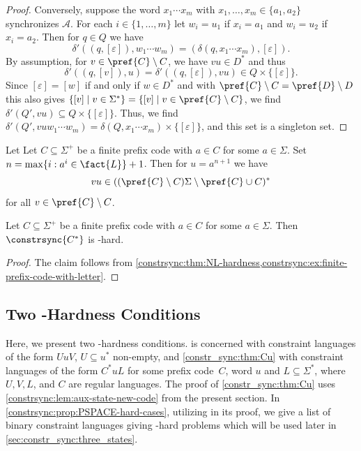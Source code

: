\begin{proof}
	Conversely, suppose the word $x_1 \cdots x_m$ with $x_1,\ldots,x_m \in \{a_1, a_2\}$
	synchronizes $\mathcal A$.
	For each $i \in \{1,\ldots,m\}$
	let $w_i = u_1$ if $x_i = a_1$ and $w_i = u_2$ if $x_i = a_2$.
	Then for $q \in Q$
	we have
	\[
	\delta'((q, [\varepsilon]), w_1 \cdots w_m) = (\delta(q, x_1 \cdots x_m), [\varepsilon]).
	\]
	By assumption, for $v \in \pref{C} \setminus C$, we have $vu \in D^*$
	and thus
	\[
	\delta'((q, [v]), u) = \delta'((q, [\varepsilon]), vu) \in Q \times \{[\varepsilon]\}.
	\]
	Since $[\varepsilon] = [w]$ if and only if $w \in D^*$
	and with $\pref{C}\setminus C = \pref{D} \setminus D$
	this also gives $\{[v] \mid v \in \Sigma^* \} = \{[v] \mid v \in \pref{C}\setminus C\}$,
	we find $\delta'(Q', vu) \subseteq Q \times \{[\varepsilon]\}$.
	Thus, we find $\delta'(Q', vu w_1 \cdots w_m) = \delta(Q, x_1 \cdots x_m) \times \{[\varepsilon]\}$,
	and this set is a singleton set.
\end{proof}

\begin{example} \label{constrsync:ex:finite-prefix-code-with-letter}
	Let Let $C \subseteq \Sigma^+$ be a finite prefix code with $a \in C$
	for some $a \in \Sigma$.
	Set $n = \max\{ i : a^i \in \fact{L} \} + 1$.
	Then for $u = a^{n+1}$ we have
	\[
	vu \in ( (\pref{C}\setminus C)\Sigma \setminus \pref{C} \cup C )^*	
	\]
	for all $v \in \pref{C} \setminus C$.
\end{example}

\begin{corollary}
	Let $C \subseteq \Sigma^+$ be a  finite prefix code with $a \in C$
	for some $a \in \Sigma$.
	Then $\constrsync{C^*}$ is \NL-hard.
\end{corollary}
\begin{proof}
	The claim follows from
	\cref{constrsync:thm:NL-hardness,constrsync:ex:finite-prefix-code-with-letter}.
\end{proof}


\subsection{Two \PSPACE-Hardness Conditions}
\label{constr_sync:sec:PSPACE-hardness}

Here, we present two \PSPACE-hardness conditions. 
 is concerned with constraint languages
of the form $UuV$, $U \subseteq u^*$ non-empty, 
and \cref{constr_sync:thm:Cu} with constraint
languages of the form $C^*uL$
for some prefix code~$C$, word $u$
and $L \subseteq \Sigma^*$, where $U, V, L$, and $C$ are regular languages.
The proof of \cref{constr_sync:thm:Cu} uses \cref{constrsync:lem:aux-state-new-code} 
from the present section.
In \cref{constrsync:prop:PSPACE-hard-cases}, utilizing
 in its proof,
we give a list of binary constraint languages giving \PSPACE-hard
problems which will be used later in \cref{sec:constr_sync:three_states}.

